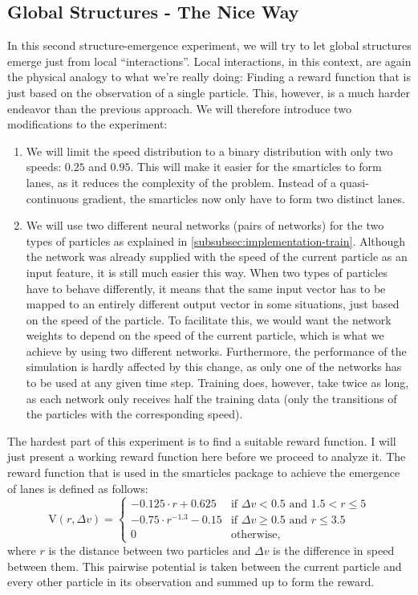 \subsection{Global Structures - The Nice Way}
\label{subsec:global_structure_nice}
In this second structure-emergence experiment, we will try to let global structures emerge just from local \enquote{interactions}. Local interactions, in this context, are again the physical analogy to what we're really doing: Finding a reward function that is just based on the observation of a single particle. This, however, is a much harder endeavor than the previous approach. We will therefore introduce two modifications to the experiment:
\begin{enumerate}
    \item We will limit the speed distribution to a binary distribution with only two speeds: $0.25$ and $0.95$. This will make it easier for the smarticles to form lanes, as it reduces the complexity of the problem. Instead of a quasi-continuous gradient, the smarticles now only have to form two distinct lanes.
    \item We will use two different neural networks (pairs of networks) for the two types of particles as explained in \ref{subsubsec:implementation-train}. Although the network was already supplied with the speed of the current particle as an input feature, it is still much easier this way. When two types of particles have to behave differently, it means that the same input vector has to be mapped to an entirely different output vector in some situations, just based on the speed of the particle. To facilitate this, we would want the network weights to depend on the speed of the current particle, which is what we achieve by using two different networks. Furthermore, the performance of the simulation is hardly affected by this change, as only one of the networks has to be used at any given time step. Training does, however, take twice as long, as each network only receives half the training data (only the transitions of the particles with the corresponding speed).
\end{enumerate}
The hardest part of this experiment is to find a suitable reward function. I will just present a working reward function here before we proceed to analyze it. The reward function that is used in the smarticles package to achieve the emergence of lanes is defined as follows:
\begin{equation}
    \text{V}(r, \Delta v) = \begin{cases}
        -0.125 \cdot r + 0.625 & \text{if } \Delta v < 0.5 \text{ and } 1.5 < r \le 5 \\
        -0.75 \cdot r^{-1.3} - 0.15 & \text{if } \Delta v \ge 0.5 \text{ and } r \le 3.5 \\
        0 & \text{otherwise} \text{,}
    \end{cases}
    \label{eq:lane_reward_func}
\end{equation}
where $r$ is the distance between two particles and $\Delta v$ is the difference in speed between them. This pairwise potential is taken between the current particle and every other particle in its observation and summed up to form the reward. 


